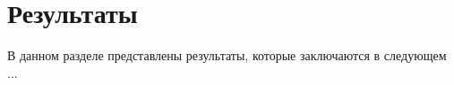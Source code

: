%
%

\section{Результаты}
\label{ch:results}

В данном разделе представлены результаты, которые заключаются в следующем ...
